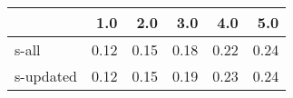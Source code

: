 \begin{tabular}{lrrrrr}
\toprule
{} &  1.0 &  2.0 &  3.0 &  4.0 &  5.0 \\
\midrule
s-all     & 0.12 & 0.15 & 0.18 & 0.22 & 0.24 \\
s-updated & 0.12 & 0.15 & 0.19 & 0.23 & 0.24 \\
\bottomrule
\end{tabular}
